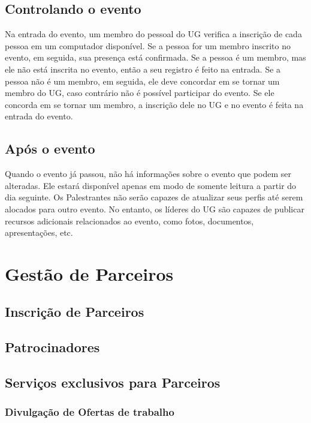 \documentclass[envcountsame,envcountchap,letterpaper]{svmono}
\begin{document}
\section{Controlando o evento}

Na entrada do evento, um membro do pessoal do UG verifica a inscrição de cada pessoa em um computador disponível. Se a pessoa for um membro inscrito no evento, em seguida, sua presença está confirmada. Se a pessoa é um membro, mas ele não está inscrita no evento, então a seu registro é feito na entrada. Se a pessoa não é um membro, em seguida, ele deve concordar em se tornar um membro do UG, caso contrário não é possível participar do evento. Se ele concorda em se tornar um membro, a inscrição dele no UG e no evento é feita na entrada do evento.

\section{Após o evento}

Quando o evento já passou, não há informações sobre o evento que podem ser alteradas. Ele estará disponível apenas em modo de somente leitura a partir do dia seguinte. Os Palestrantes não serão capazes de atualizar seus perfis até serem alocados para outro evento. No entanto, os líderes do UG são capazes de publicar recursos adicionais relacionados ao evento, como fotos, documentos, apresentações, etc.

\chapter{Gestão de Parceiros}

\section{Inscrição de Parceiros}

\section{Patrocinadores}

\section{Serviços exclusivos para Parceiros}

\subsection{Divulgação de Ofertas de trabalho}
\end{document}
